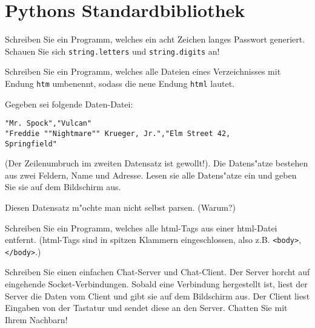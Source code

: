 \section*{Pythons Standardbibliothek}

\begin{aufgabe}
Schreiben Sie ein Programm, welches ein acht Zeichen langes Passwort generiert. \hinweis Schauen Sie sich \lstinline{string.letters} und \lstinline{string.digits} an!
\end{aufgabe}

\begin{aufgabe}
Schreiben Sie ein Programm, welches alle Dateien eines Verzeichnisses mit Endung \texttt{htm} umbenennt, sodass die neue Endung \texttt{html} lautet.
\end{aufgabe}

\begin{aufgabe}[CSV]
Gegeben sei folgende Daten-Datei:
\begin{verbatim}
"Mr. Spock","Vulcan"
"Freddie ""Nightmare"" Krueger, Jr.","Elm Street 42,
Springfield" 
\end{verbatim}
(Der Zeilenumbruch im zweiten Datensatz ist gewollt!). Die Datens"atze bestehen aus zwei Feldern, Name und Adresse. Lesen sie alle Datens"atze ein und geben Sie sie auf dem Bildschirm aus.

\hinweis Diesen Datensatz m"ochte man nicht selbst parsen. (Warum?)
\end{aufgabe}

\begin{aufgabe}
Schreiben Sie ein Programm, welches alle html-Tags aus einer html-Datei entfernt. (html-Tags sind in spitzen Klammern eingeschlossen, also z.B. \texttt{<body>}, \texttt{</body>}.)
\end{aufgabe}

\begin{aufgabe}
Schreiben Sie einen einfachen \glqq Chat-Server\grqq{} und \glqq Chat-Client\grqq . Der Server horcht auf eingehende Socket-Verbindungen. Sobald eine Verbindung hergestellt ist, liest der Server die Daten vom Client und gibt sie auf dem Bildschirm aus. Der Client liest Eingaben von der Tastatur und sendet diese an den Server. \glqq Chatten\grqq{} Sie mit Ihrem Nachbarn! 
\end{aufgabe}



